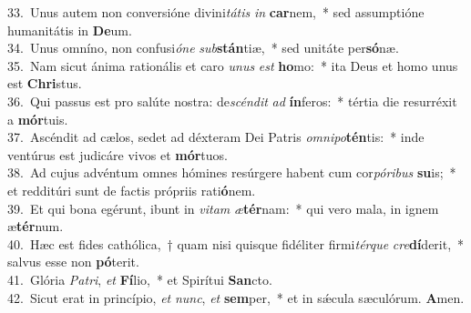 {33.~}Unus autem non conversióne divini\textit{tá}\textit{tis} \textit{in} \textbf{car}nem,~* sed assumptióne humanitátis in \textbf{De}um.\\
{34.~}Unus omníno, non confusi\textit{ó}\textit{ne} \textit{sub}\textbf{stán}tiæ,~* sed unitáte per\textbf{só}næ.\\
{35.~}Nam sicut ánima rationális et caro \textit{u}\textit{nus} \textit{est} \textbf{ho}mo:~* ita Deus et homo unus est \textbf{Chri}stus.\\
{36.~}Qui passus est pro salúte nostra: de\textit{scén}\textit{dit} \textit{ad} \textbf{ín}feros:~* tértia die resurréxit a \textbf{mór}tuis.\\
{37.~}Ascéndit ad cælos, sedet ad déxteram Dei Patris \textit{om}\textit{ni}\textit{po}\textbf{tén}tis:~* inde ventúrus est judicáre vivos et \textbf{mór}tuos.\\
{38.~}Ad cujus advéntum omnes hómines resúrgere habent cum cor\textit{pó}\textit{ri}\textit{bus} \textbf{su}is;~* et redditúri sunt de factis própriis rati\textbf{ó}nem.\\
{39.~}Et qui bona egérunt, ibunt in \textit{vi}\textit{tam} \textit{æ}\textbf{tér}nam:~* qui vero mala, in ignem æ\textbf{tér}num.\\
{40.~}Hæc est fides cathólica,~† quam nisi quisque fidéliter firmi\textit{tér}\textit{que} \textit{cre}\textbf{dí}derit,~* salvus esse non \textbf{pó}terit.\\
{41.~}Glória \textit{Pa}\textit{tri}, \textit{et} \textbf{Fí}lio,~* et Spirítui \textbf{San}cto.\\
{42.~}Sicut erat in princípio, \textit{et} \textit{nunc}, \textit{et} \textbf{sem}per,~* et in sǽcula sæculórum. \textbf{A}men.\\
